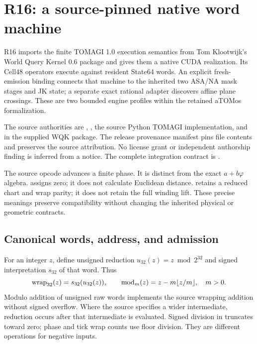 \section{R16: a source-pinned native word machine}
\label{sec:r16-wqk}

R16 imports the finite TOMAGI 1.0 execution semantics from Tom Klootwijk's
World Query Kernel 0.6 package and gives them a native CUDA realization.
Its Cell48 operators execute against resident State64 words. An explicit
fresh-emission binding connects that machine to the inherited two ASA/NA
mask stages and JK state; a separate exact rational adapter discovers
affine plane crossings. These are two bounded engine profiles within the
retained aTOMos formalization.

The source authorities are ,
, the source Python TOMAGI implementation, and
 in the supplied WQK package.
The release provenance manifest pins file contents and preserves the
source attribution. No license grant or independent authorship finding
is inferred from a notice. The complete integration contract is
.

\begin{panel}
The source opcode  advances a finite phase. It is distinct
from the exact $a+b\varphi$ algebra.  assigns zero; it does
not calculate Euclidean distance.  retains a reduced chart
and wrap parity; it does not retain the full winding lift. These precise
meanings preserve compatibility without changing the inherited physical
or geometric contracts.
\end{panel}

\subsection{Canonical words, address, and admission}

For an integer $z$, define unsigned reduction $u_{32}(z)=z\bmod2^{32}$
and signed interpretation $s_{32}$ of that word. Thus
\begin{equation}
 \operatorname{wrap}_{32}(z)=s_{32}(u_{32}(z)),\qquad
 \operatorname{mod}_m(z)=z-m\lfloor z/m\rfloor,\quad m>0.
 \label{eq:r16-word-wrap}
\end{equation}
Modulo addition of unsigned raw words implements the source wrapping
addition without signed overflow. Where the source specifies a wider
intermediate, reduction occurs after that intermediate is evaluated.
Signed division in  truncates toward zero; phase and tick
wrap counts use floor division. They are different operations for
negative inputs.

